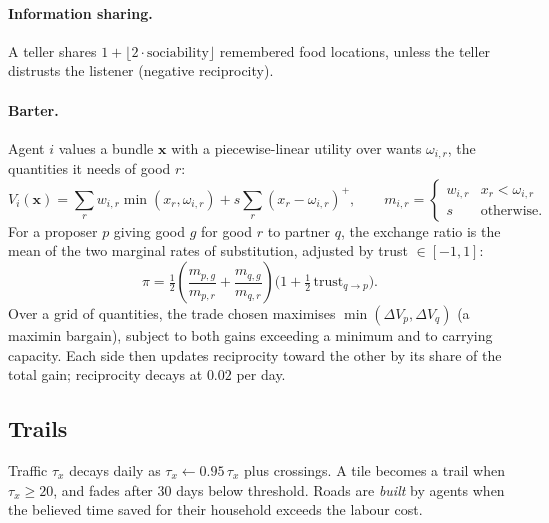 \documentclass[11pt]{article}
\theoremstyle{definition}
\newcommand{\1}{\mathbf{1}}
\begin{document}
\paragraph{Information sharing.} A teller shares $1 + \lfloor 2\cdot\text{sociability}\rfloor$ remembered food locations, unless the teller distrusts the listener (negative reciprocity).

\paragraph{Barter.} Agent $i$ values a bundle $\mathbf{x}$ with a piecewise-linear utility over wants $\omega_{i,r}$, the quantities it needs of good $r$:
\begin{equation}
V_i(\mathbf{x}) = \sum_{r} w_{i,r}\min(x_r,\omega_{i,r}) + s\sum_r (x_r-\omega_{i,r})^+,
\qquad m_{i,r} = \begin{cases} w_{i,r} & x_r<\omega_{i,r}\\ s & \text{otherwise.}\end{cases}
\label{eq:barter}
\end{equation}
For a proposer $p$ giving good $g$ for good $r$ to partner $q$, the exchange ratio is the mean of the two marginal rates of substitution, adjusted by trust $\in[-1,1]$:
\begin{equation}
\pi = \tfrac12\!\left(\frac{m_{p,g}}{m_{p,r}}+\frac{m_{q,g}}{m_{q,r}}\right)\big(1+\tfrac12\,\text{trust}_{q\to p}\big).
\end{equation}
Over a grid of quantities, the trade chosen maximises $\min(\Delta V_p,\Delta V_q)$ (a maximin bargain), subject to both gains exceeding a minimum and to carrying capacity. Each side then updates reciprocity toward the other by its share of the total gain; reciprocity decays at $0.02$ per day.

\subsection{Trails}
Traffic $\tau_x$ decays daily as $\tau_x\leftarrow0.95\,\tau_x$ plus crossings. A tile becomes a trail when $\tau_x\ge20$, and fades after 30 days below threshold. Roads are \emph{built} by agents when the believed time saved for their household exceeds the labour cost.
\end{document}
